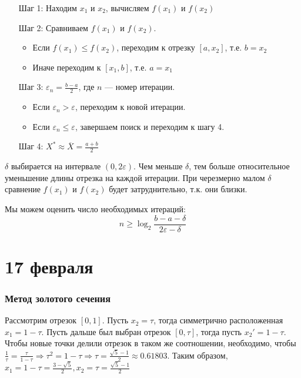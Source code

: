 \documentclass[12pt, a4paper, oneside]{book}
\begin{document}
\begin{itemize}
    \item [Шаг 1:] Находим \(x_1\) и \(x_2\), вычисляем \(f(x_1)\) и \(f(x_2)\)
    \item [Шаг 2:] Сравниваем \(f(x_1)\) и \(f(x_2)\).
          \begin{itemize}
              \item Если \(f(x_1) \leq f(x_2)\), переходим к отрезку \([a, x_2]\), т.е. \(b = x_2\)
              \item Иначе переходим к \([x_1, b]\), т.е. \(a = x_1\)
          \end{itemize}
    \item [Шаг 3:] \(\varepsilon_n = \frac{b - a}{2} \), где \(n\) --- номер итерации.
          \begin{itemize}
              \item Если \(\varepsilon_n > \varepsilon\), переходим к новой итерации.
              \item Если \(\varepsilon_n \leq \varepsilon\), завершаем поиск и переходим к шагу 4.
          \end{itemize}
    \item [Шаг 4:] \(X^* \approx \overline X = \frac{a + b}{2}\)
\end{itemize}

\begin{remark}
    \(\delta\) выбирается на интервале \((0, 2\varepsilon)\). Чем меньше \(\delta\), тем больше относительное уменьшение длины отрезка на каждой итерации. При черезмерно малом \(\delta\) сравнение \(f(x_1)\) и \(f(x_2)\) будет затруднительно, т.к. они близки.
\end{remark}

Мы можем оценить число необходимых итераций:
\[n \geq \log_2 \frac{b - a - \delta}{2\varepsilon - \delta}\]

\chapter{17 февраля}

\subsection{Метод золотого сечения}

Рассмотрим отрезок \([0, 1]\). Пусть \(x_2 = \tau\), тогда симметрично расположенная \(x_1 = 1 - \tau\). Пусть дальше был выбран отрезок \([0, \tau]\), тогда пусть \(x_2' = 1 - \tau\). Чтобы новые точки делили отрезок в таком же соотношении, необходимо, чтобы \(\frac{1}{\tau} = \frac{\tau}{1 - \tau} \Rightarrow \tau^2 = 1 - \tau \Rightarrow \tau = \frac{\sqrt{5} - 1}{2} \approx 0.61803\). Таким образом, \(x_1 = 1 - \tau = \frac{3 - \sqrt{5}}{2}, x_2 = \tau = \frac{\sqrt{5} - 1}{2}\)
\end{document}
